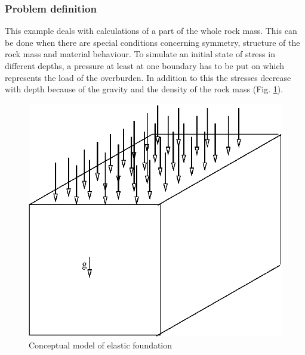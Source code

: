 \subsubsection*{Problem definition}
\label{sec:el2d}
This example deals with calculations of a part of the whole rock mass.
This can be done when there are special conditions concerning symmetry,
structure of the rock mass and material behaviour.
To simulate an initial state of stress in different depths,
a pressure at least at one boundary has to be put on which represents
the load of the overburden. In addition to this the stresses decrease with
depth because of the gravity and the density of the rock mass (Fig. \ref{fme:cfound}).

\begin{figure}[!htb]
  \begin{center}
    \includegraphics[scale=0.5]{M/ex_plate_model.eps}
  \end{center}
  \caption{Conceptual model of elastic foundation}
  \label{fme:cfound}
\end{figure}

